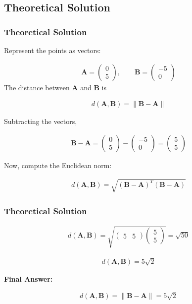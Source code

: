 \documentclass{beamer}
\theoremstyle{remark}
\newcommand{\myvec}[1]{\ensuremath{\begin{pmatrix}#1\end{pmatrix}}}
\let\vec\mathbf
\numberwithin{equation}{section}
\begin{document}
\subsection{Theoretical Solution }
\begin{frame}
\frametitle{Theoretical Solution}
Represent the points as vectors:

\begin{align}
 \vec{A}= \myvec{0 \\ 5}, \qquad \vec{B} = \myvec{-5 \\ 0} 
\end{align}
The distance between $\vec{A}$ and $\vec{B}$ is


\begin{align}
d(\vec{A},\vec{B}) = \|\vec{B} - \vec{A}\| 
\end{align}

Subtracting the vectors,

\begin{align}
\vec{B} - \vec{A} = \myvec{0 \\ 5 } - \myvec{-5 \\ 0} = \myvec{5\\ 5}
\end{align}


Now, compute the Euclidean norm:

\begin{align}
d(\vec{A},\vec{B}) = \sqrt{(\vec{B}-\vec{A})^T(\vec{B}-\vec{A})}
\end{align}
\end{frame}

\begin{frame}
\frametitle{Theoretical Solution}

\begin{align}
d(\vec{A},\vec{B}) = \sqrt{\myvec{5& 5}\myvec{5\\ 5}} = \sqrt{50}
\end{align}


\begin{align}
 d(\vec{A},\vec{B}) = 5\sqrt{2}
\end{align}



\textbf{Final Answer:}

\begin{align}
 d(\vec{A},\vec{B}) = \|\vec{B} - \vec{A}\| = 5\sqrt{2}
\end{align}



\end{frame}
\end{document}
